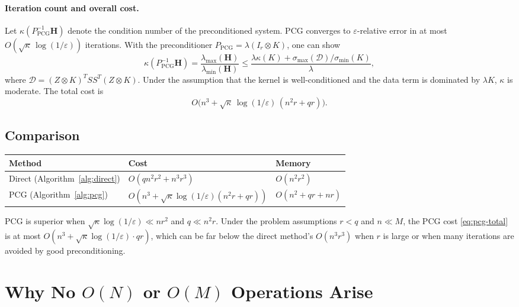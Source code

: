 \documentclass[12pt]{article}
\theoremstyle{definition}
\begin{document}
\paragraph{Iteration count and overall cost.}
Let $\kappa(P_{\mathrm{PCG}}^{-1}\mathbf{H})$ denote the condition number of the preconditioned
system.  PCG converges to $\varepsilon$-relative error in at most
$O(\sqrt{\kappa}\,\log(1/\varepsilon))$ iterations.  With the preconditioner
$P_{\mathrm{PCG}} = \lambda(I_r \otimes K)$, one can show
\[
  \kappa(P_{\mathrm{PCG}}^{-1}\mathbf{H})
  = \frac{\lambda_{\max}(\mathbf{H})}{\lambda_{\min}(\mathbf{H})}
  \leq \frac{\lambda \kappa(K) + \sigma_{\max}(\mathcal{D})/\sigma_{\min}(K)}{\lambda},
\]
where $\mathcal{D} = (Z \otimes K)^T SS^T (Z \otimes K)$.  Under the assumption that the
kernel is well-conditioned and the data term is dominated by $\lambda K$, $\kappa$ is moderate.
The total cost is
\begin{equation}
  O\!\bigl(n^3 + \sqrt{\kappa}\,\log(1/\varepsilon)\,(n^2 r + qr)\bigr).
  \label{eq:pcg-total}
\end{equation}

\subsection{Comparison}

\begin{center}
\begin{tabular}{lll}
  \toprule
  Method & Cost & Memory \\
  \midrule
  Direct (Algorithm~\ref{alg:direct}) & $O(q n^2 r^2 + n^3 r^3)$ & $O(n^2 r^2)$ \\
  PCG (Algorithm~\ref{alg:pcg}) & $O(n^3 + \sqrt{\kappa}\log(1/\varepsilon)(n^2 r + qr))$ & $O(n^2 + qr + nr)$ \\
  \bottomrule
\end{tabular}
\end{center}

PCG is superior when $\sqrt{\kappa}\log(1/\varepsilon) \ll nr^2$ and $q \ll n^2r$.
Under the problem assumptions $r < q$ and $n \ll M$, the PCG cost \eqref{eq:pcg-total}
is at most $O(n^3 + \sqrt{\kappa}\log(1/\varepsilon) \cdot qr)$, which can be far below
the direct method's $O(n^3 r^3)$ when $r$ is large or when many iterations are avoided
by good preconditioning.

\section{Why No $O(N)$ or $O(M)$ Operations Arise}
\end{document}
